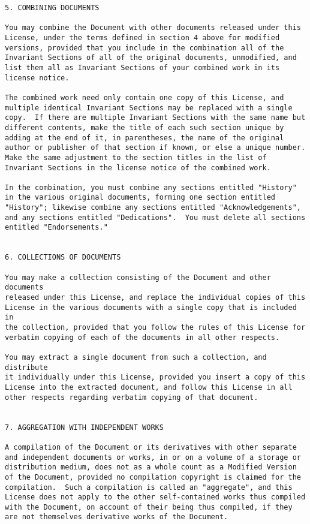 \documentclass[12pt]{article}
\begin{document}
\begin{verbatim}
5. COMBINING DOCUMENTS

You may combine the Document with other documents released under this
License, under the terms defined in section 4 above for modified
versions, provided that you include in the combination all of the
Invariant Sections of all of the original documents, unmodified, and
list them all as Invariant Sections of your combined work in its
license notice.

The combined work need only contain one copy of this License, and
multiple identical Invariant Sections may be replaced with a single
copy.  If there are multiple Invariant Sections with the same name but
different contents, make the title of each such section unique by
adding at the end of it, in parentheses, the name of the original
author or publisher of that section if known, or else a unique number.
Make the same adjustment to the section titles in the list of
Invariant Sections in the license notice of the combined work.

In the combination, you must combine any sections entitled "History"
in the various original documents, forming one section entitled
"History"; likewise combine any sections entitled "Acknowledgements",
and any sections entitled "Dedications".  You must delete all sections
entitled "Endorsements."


6. COLLECTIONS OF DOCUMENTS

You may make a collection consisting of the Document and other documents
released under this License, and replace the individual copies of this
License in the various documents with a single copy that is included in
the collection, provided that you follow the rules of this License for
verbatim copying of each of the documents in all other respects.

You may extract a single document from such a collection, and distribute
it individually under this License, provided you insert a copy of this
License into the extracted document, and follow this License in all
other respects regarding verbatim copying of that document.


7. AGGREGATION WITH INDEPENDENT WORKS

A compilation of the Document or its derivatives with other separate
and independent documents or works, in or on a volume of a storage or
distribution medium, does not as a whole count as a Modified Version
of the Document, provided no compilation copyright is claimed for the
compilation.  Such a compilation is called an "aggregate", and this
License does not apply to the other self-contained works thus compiled
with the Document, on account of their being thus compiled, if they
are not themselves derivative works of the Document.


\end{verbatim}
\end{document}
